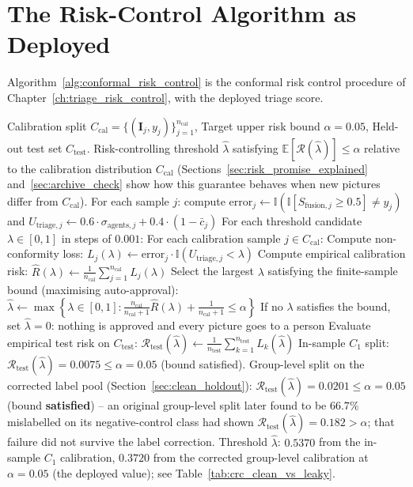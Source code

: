 \documentclass[12pt,a4paper]{report}
\begin{document}
\section{The Risk-Control Algorithm as Deployed}
\label{sec:crc_algorithm_deployed}
Algorithm~\ref{alg:conformal_risk_control} is the conformal risk control procedure of Chapter~\ref{ch:triage_risk_control}, with the deployed triage score.

\begin{algorithm}[!htbp]
\caption{Distribution-Free Conformal Risk Control Calibration (CRC)}
\label{alg:conformal_risk_control}
\begin{algorithmic}[1]
\Require Calibration split $C_{\text{cal}} = \{(\mathbf{I}_j, y_j)\}_{j=1}^{n_{\text{cal}}}$, Target upper risk bound $\alpha = 0.05$, Held-out test set $C_{\text{test}}$.
\Ensure Risk-controlling threshold $\hat{\lambda}$ satisfying $\mathbb{E}[\mathcal{R}(\hat{\lambda})] \le \alpha$ relative to the calibration distribution $C_{\text{cal}}$ (Sections~\ref{sec:risk_promise_explained} and~\ref{sec:archive_check} show how this guarantee behaves when new pictures differ from $C_{\text{cal}}$).
\State For each sample $j$: compute $\text{error}_j \leftarrow \mathbb{I}(\mathbb{I}[S_{\text{fusion}, j} \ge 0.5] \neq y_j)$ and $U_{\text{triage}, j} \leftarrow 0.6 \cdot \sigma_{\text{agents}, j} + 0.4 \cdot (1 - \bar{c}_j)$
\State For each threshold candidate $\lambda \in [0, 1]$ in steps of $0.001$:
\State \quad For each calibration sample $j \in C_{\text{cal}}$:
\State \qquad Compute non-conformity loss: $L_j(\lambda) \leftarrow \text{error}_j \cdot \mathbb{I}(U_{\text{triage}, j} < \lambda)$ 
\State \quad Compute empirical calibration risk: $\hat{R}(\lambda) \leftarrow \frac{1}{n_{\text{cal}}} \sum_{j=1}^{n_{\text{cal}}} L_j(\lambda)$
\State Select the largest $\lambda$ satisfying the finite-sample bound (maximising auto-approval):
\State \quad $\hat{\lambda} \leftarrow \max \left\{ \lambda \in [0, 1] : \frac{n_{\text{cal}}}{n_{\text{cal}} + 1} \hat{R}(\lambda) + \frac{1}{n_{\text{cal}} + 1} \le \alpha \right\}$
\State \quad If no $\lambda$ satisfies the bound, set $\hat\lambda = 0$: nothing is approved and every picture goes to a person
\State Evaluate empirical test risk on $C_{\text{test}}$: $\mathcal{R}_{\text{test}}(\hat{\lambda}) \leftarrow \frac{1}{n_{\text{test}}} \sum_{k=1}^{n_{\text{test}}} L_k(\hat{\lambda})$
\State In-sample $C_1$ split: $\mathcal{R}_{\text{test}}(\hat{\lambda}) = 0.0075 \le \alpha = 0.05$ (bound satisfied). Group-level split on the corrected label pool (Section~\ref{sec:clean_holdout}): $\mathcal{R}_{\text{test}}(\hat{\lambda}) = 0.0201 \le \alpha = 0.05$ (bound \textbf{satisfied}) -- an original group-level split later found to be $66.7\%$ mislabelled on its negative-control class had shown $\mathcal{R}_{\text{test}}(\hat{\lambda}) = 0.182 > \alpha$; that failure did not survive the label correction.
\State \Return Threshold $\hat{\lambda}$: $0.5370$ from the in-sample $C_1$ calibration, $0.3720$ from the corrected group-level calibration at $\alpha=0.05$ (the deployed value); see Table~\ref{tab:crc_clean_vs_leaky}.
\end{algorithmic}
\end{algorithm}
\end{document}
